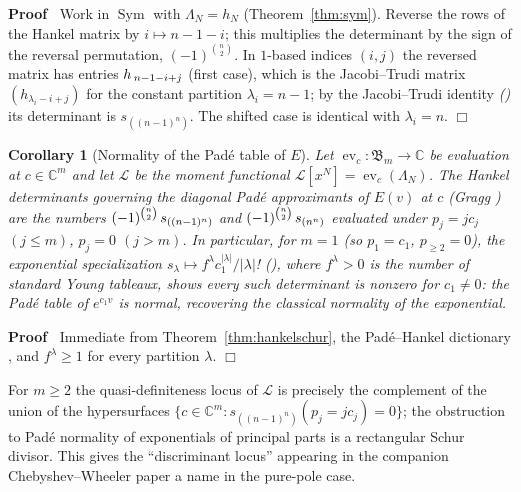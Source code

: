 \documentclass{article}
\newcommand{\tmem}[1]{{\em #1\/}}
\newcommand{\tmop}[1]{\ensuremath{\operatorname{#1}}}
\newenvironment{proof}{\noindent\textbf{Proof\ }}{\hspace*{\fill}$\Box$\medskip}
\newtheorem{corollary}{Corollary}
\newcommand{\Sym}{\tmop{Sym}}
\newcommand{\ev}{\tmop{ev}}
\newcommand{\CA}{\mathfrak{B}}
\newcommand{\C}{\mathbb{C}}
\begin{document}
\begin{proof}
  Work in $\Sym$ with $\Lambda_N = h_N$ (Theorem~\ref{thm:sym}). Reverse the
  rows of the Hankel matrix by $i \mapsto n - 1 - i$; this multiplies the
  determinant by the sign of the reversal permutation, $(- 1)^{\binom{n}{2}}$.
  In $1$-based indices $(i, j)$ the reversed matrix has entries
  $h_{\hspace{0.17em} n - 1 - i + j}$ (first case), which is the Jacobi--Trudi
  matrix $(h_{\lambda_i - i + j})$ for the constant partition $\lambda_i = n -
  1$; by the Jacobi--Trudi identity {\tmem{({\cite[I.(3.4)]{Macdonald}})}} its
  determinant is $s_{((n - 1)^n)}$. The shifted case is identical with
  $\lambda_i = n$.
\end{proof}

\begin{corollary}
  [Normality of the Pad{\'e} table of $E$]\label{cor:padeE} Let $\ev_c : \CA_m
  \to \C$ be evaluation at $c \in \C^m$ and let $\mathcal{L}$ be the moment
  functional $\mathcal{L} [x^N] = \ev_c (\Lambda_N)$. The Hankel determinants
  governing the diagonal Pad{\'e} approximants of $E (v)$ at $c$ {\tmem{(Gragg
  {\cite{Gragg}})}} are the numbers $(- 1)^{\binom{n}{2}}  \hspace{0.17em}
  s_{((n - 1)^n)}$ and $(- 1)^{\binom{n}{2}}  \hspace{0.17em} s_{(n^n)}$
  evaluated under $p_j = jc_j$ $(j \le m)$, $p_j = 0$ $(j > m)$. In
  particular, for $m = 1$ (so $p_1 = c_1$, $p_{\ge 2} = 0$), the exponential
  specialization $s_{\lambda} \mapsto f^{\lambda} c_1^{| \lambda |} / |
  \lambda |$! {\tmem{({\cite[I.{\textsection}7, Ex.~24(a) with $n \to \infty$;
  equivalently $\ev$ of {\cite[I.(5.16)]{Macdonald}} at the exponential
  specialization]{Macdonald}}{\hspace{0.17em}})}}, where $f^{\lambda} > 0$ is
  the number of standard Young tableaux, shows every such determinant is
  nonzero for $c_1 \ne 0$: the Pad{\'e} table of $e^{c_1 v}$ is normal,
  recovering the classical normality of the exponential.
\end{corollary}

\begin{proof}
  Immediate from Theorem~\ref{thm:hankelschur}, the Pad{\'e}--Hankel
  dictionary {\cite{Gragg}}, and $f^{\lambda} \ge 1$ for every partition
  $\lambda$.
\end{proof}

\begin{remark}
  \label{rem:zeroloci}For $m \ge 2$ the quasi-definiteness locus of
  $\mathcal{L}$ is precisely the complement of the union of the hypersurfaces
  $\{c \in \C^m : s_{((n - 1)^n)} (p_j = jc_j) = 0\}$; the obstruction to
  Pad{\'e} normality of exponentials of principal parts is a rectangular Schur
  divisor. This gives the ``discriminant locus'' appearing in the companion
  Chebyshev--Wheeler paper a name in the pure-pole case.
\end{remark}
\end{document}
